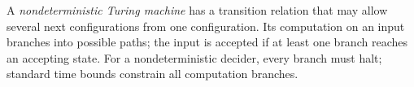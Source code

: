 
A \emph{nondeterministic Turing machine} has a transition relation that may allow several next configurations from one configuration. Its computation on an input branches into possible paths; the input is accepted if at least one branch reaches an accepting state. For a nondeterministic decider, every branch must halt; standard time bounds constrain all computation branches.
